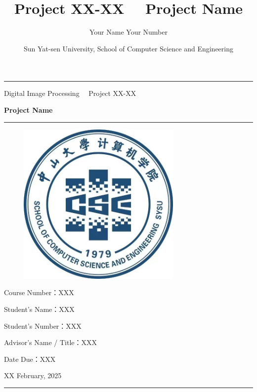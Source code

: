\documentclass[a4paper, utk8]{ctexart}
\title{\bfseries Project XX-XX \ \ Project Name}
\author{\fangsong Your Name \quad Your Number}
\date{\fangsong Sun Yat-sen University, School of Computer Science and Engineering}
\begin{document}
    \begin{titlepage}
	\centering
	\rule{\textwidth}{1pt}
	\vspace{0.02\textheight}

	{\LARGE Digital Image Processing \ \ Project XX-XX}

	\vspace{0.02\textheight}

	{\Huge \bfseries Project Name}

	\vspace{0.025\textheight}
	\rule{0.83\textwidth}{0.4pt}
	\vspace{0.05\textheight} 
	\begin{figure}[htbp]
		\centering
		\includegraphics[width=8cm, height=8cm]{./figure/Department_Sign.jpg}
	\end{figure}

	\vspace{0.05\textheight} 
	{\Large Course Number：\textsc{XXX}}

	\vspace{0.025\textheight} 
	{\Large Student's Name：\textsc{XXX}}

    \vspace{0.025\textheight} 
    {\Large Student's Number：\textsc{XXX}}

    \vspace{0.025\textheight} 
	{\Large Advisor's Name / Title：\textsc{XXX}}
 
    \vspace{0.025\textheight} 
	{\Large Date Due：\textsc{XXX}}

    \vspace{0.05\textheight} 
	\vfill

	{\large XX February, 2025}
	\vspace{0.1\textheight}
	\rule{\textwidth}{1pt}
    \end{titlepage}
    \let\cleardoublepage\clearpage
\end{document}
